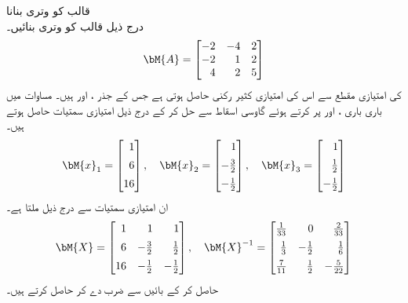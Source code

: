 \quad قالب کو وتری بنانا\\
درج ذیل قالب کو وتری بنائیں۔
\begin{align*}
\bM{A}=\begin{bmatrix*}[r]-2&-4&2\\-2&1&2\\4&2&5  \end{bmatrix*}
\end{align*}
 کی امتیازی مقطع سے اس کی امتیازی کثیر رکنی  حاصل ہوتی ہے جس کے جذر ،  اور  ہیں۔ مساوات  میں باری باری ،  اور  پر کرتے ہوئے گاوسی اسقاط سے حل کر کے درج ذیل امتیازی سمتیات حاصل ہوتے ہیں۔
\begin{align*}
\bM{x}_1=\begin{bmatrix*}[r]1 \\[0.5em] 6 \\[0.5em] 16  \end{bmatrix*}, \quad \bM{x}_2=\begin{bmatrix*}[r]1 \\[0.5em] -\tfrac{3}{2} \\[0.5em] -\tfrac{1}{2}  \end{bmatrix*},\quad \bM{x}_3=\begin{bmatrix*}[r]1 \\[0.5em] \tfrac{1}{2} \\[0.5em]-\tfrac{1}{2}  \end{bmatrix*}
\end{align*}
ان امتیازی سمتیات سے درج ذیل ملتا ہے۔
\begin{align*}
\bM{X}=\begin{bmatrix*}[r] 1&1&1\\[0.5em] 6&-\tfrac{3}{2}&\tfrac{1}{2}\\[0.5em] 16&-\tfrac{1}{2}& -\tfrac{1}{2} \end{bmatrix*}, \quad 
\bM{X}^{-1}=\begin{bmatrix*}[r] \tfrac{1}{33}&0&\tfrac{2}{33}\\[0.5em]\tfrac{1}{3}&-\tfrac{1}{2}&\tfrac{1}{6}\\[0.5em]
\tfrac{7}{11}&\tfrac{1}{2}&-\tfrac{5}{22}\end{bmatrix*}
\end{align*}
 حاصل کر کے بائیں  سے ضرب دے کر  حاصل کرتے ہیں۔
